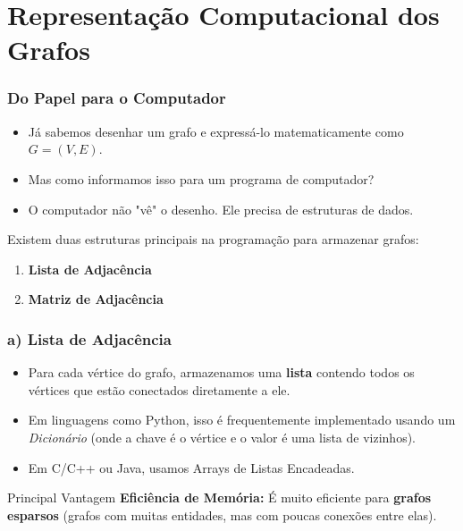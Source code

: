\documentclass[9pt]{beamer}
\begin{document}
\section{Representação Computacional dos Grafos}

\begin{frame}
    \frametitle{Do Papel para o Computador}
    \begin{itemize}
        \item Já sabemos desenhar um grafo e expressá-lo matematicamente como $G=(V,E)$.
        \item Mas como informamos isso para um programa de computador?
        \item O computador não "vê" o desenho. Ele precisa de estruturas de dados.
    \end{itemize}
    \vspace{0.5cm}
    Existem duas estruturas principais na programação para armazenar grafos:
    \begin{enumerate}
        \item \textbf{Lista de Adjacência}
        \item \textbf{Matriz de Adjacência}
    \end{enumerate}
\end{frame}

\begin{frame}
    \frametitle{a) Lista de Adjacência}
    \begin{itemize}
        \item Para cada vértice do grafo, armazenamos uma \textbf{lista} contendo todos os vértices que estão conectados diretamente a ele.
        \item Em linguagens como Python, isso é frequentemente implementado usando um \textit{Dicionário} (onde a chave é o vértice e o valor é uma lista de vizinhos).
        \item Em C/C++ ou Java, usamos Arrays de Listas Encadeadas.
    \end{itemize}
    \vspace{0.5cm}
    \begin{block}{Principal Vantagem}
        \textbf{Eficiência de Memória:} É muito eficiente para \textbf{grafos esparsos} (grafos com muitas entidades, mas com poucas conexões entre elas).
    \end{block}
\end{frame}
\end{document}
